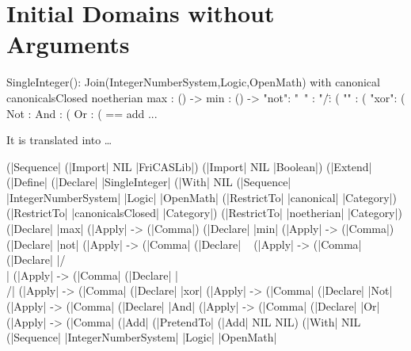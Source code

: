 \documentclass{article}
\begin{document}
\section{Initial Domains without Arguments}
\label{sec:InitDomain}
\begin{code}
SingleInteger(): Join(IntegerNumberSystem,Logic,OpenMath) with
   canonical
   canonicalsClosed
   noetherian
   max      : () -> %
   min      : () -> %
   "not":   %
   "~"  :   %
   "/\": (%
   "\/" : (%
   "xor": (%
   Not  : %
   And  : (%
   Or   : (%
 == add
   ...
\end{code}
It is translated into \ldots
\begin{code}
(|Sequence| (|Import| NIL |FriCASLib|) (|Import| NIL |Boolean|)
    (|Extend|
        (|Define|
            (|Declare| |SingleInteger|
                (|With| NIL
                        (|Sequence| |IntegerNumberSystem| |Logic|
                            |OpenMath|
                            (|RestrictTo| |canonical| |Category|)
                            (|RestrictTo| |canonicalsClosed|
                                |Category|)
                            (|RestrictTo| |noetherian| |Category|)
                            (|Declare| |max| (|Apply| -> (|Comma|) %
                            (|Declare| |min| (|Apply| -> (|Comma|) %
                            (|Declare| |not|
                                (|Apply| -> (|Comma| %
                            (|Declare| ~ (|Apply| -> (|Comma| %
                            (|Declare| |/\\|
                                (|Apply| -> (|Comma| %
                            (|Declare| |\\/|
                                (|Apply| -> (|Comma| %
                            (|Declare| |xor|
                                (|Apply| -> (|Comma| %
                            (|Declare| |Not|
                                (|Apply| -> (|Comma| %
                            (|Declare| |And|
                                (|Apply| -> (|Comma| %
                            (|Declare| |Or|
                                (|Apply| -> (|Comma| %
            (|Add| (|PretendTo| (|Add| NIL NIL)
                       (|With| NIL
                               (|Sequence| |IntegerNumberSystem|
                                   |Logic| |OpenMath|

\end{code}
\end{document}
